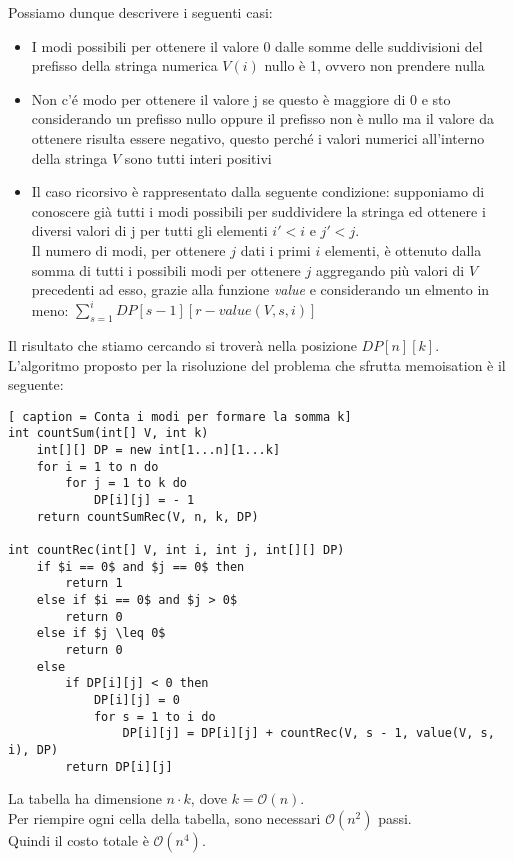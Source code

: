 \documentclass[../cheatSheetAlgoritmi.tex]{subfiles}
\begin{document}
Possiamo dunque descrivere i seguenti casi: 
\begin{itemize}
		\item I modi possibili per ottenere il valore 0 dalle somme delle suddivisioni del prefisso della stringa numerica $V(i)$ nullo è 1, ovvero non prendere nulla
		\item Non c'é modo per ottenere il valore j se questo è maggiore di 0 e sto considerando un prefisso nullo oppure il prefisso non è nullo ma il valore da ottenere risulta essere negativo, questo perché i valori numerici all'interno della stringa $V$ sono tutti interi positivi
		\item Il caso ricorsivo è rappresentato dalla seguente condizione: supponiamo di conoscere già tutti i modi possibili per suddividere la stringa ed ottenere i diversi valori di j per tutti gli elementi $i' < i$ e $j' < j$. \\ Il numero di modi, per ottenere $j$ dati i primi $i$ elementi, è ottenuto dalla somma di tutti i possibili modi per ottenere $j$ aggregando più valori di $V$ precedenti ad esso, grazie alla funzione \emph{value} e considerando un elmento in meno: $\sum_{s = 1}^{i} DP[s - 1][r - value(V, s, i)]$
\end{itemize}
Il risultato che stiamo cercando si troverà nella posizione $DP[n][k]$. \\
L'algoritmo proposto per la risoluzione del problema che sfrutta memoisation è il seguente:
\newpage
\begin{lstlisting}[ caption = Conta i modi per formare la somma k]
int countSum(int[] V, int k)
	int[][] DP = new int[1...n][1...k]
	for i = 1 to n do
		for j = 1 to k do
			DP[i][j] = - 1
	return countSumRec(V, n, k, DP)

int countRec(int[] V, int i, int j, int[][] DP)
	if $i == 0$ and $j == 0$ then
		return 1
	else if $i == 0$ and $j > 0$
		return 0
	else if $j \leq 0$
		return 0
	else 
		if DP[i][j] < 0 then
			DP[i][j] = 0
			for s = 1 to i do
				DP[i][j] = DP[i][j] + countRec(V, s - 1, value(V, s, i), DP)
		return DP[i][j]
\end{lstlisting}
La tabella ha dimensione $n \cdot k$, dove $k = \mathcal{O}(n)$. \\ 
Per riempire ogni cella della tabella, sono necessari $\mathcal{O}(n^2)$ passi. \\ Quindi il costo totale è $\mathcal{O}(n^4)$. 
\end{document}
